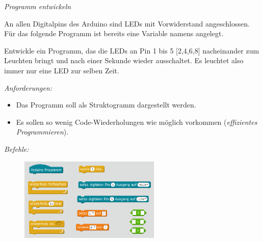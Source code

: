 \begin{aufgabe} \emph{Programm entwickeln}
	
	An allen Digitalpins des Arduino sind LEDs mit Vorwiderstand angeschlossen.	Für das folgende Programm ist bereits eine Variable namens  angelegt. 
	
	Entwickle ein Programm, das die LEDs an Pin 1 bis 5 [2,4,6,8] nacheinander zum Leuchten bringt und nach einer Sekunde wieder ausschaltet. Es leuchtet also immer nur eine LED zur selben Zeit. 
	
	\medskip
	\emph{Anforderungen:}
	\begin{itemize}[noitemsep]
		\item Das Programm soll als Struktogramm dargestellt werden.
		\item Es sollen so wenig Code-Wiederholungen wie möglich vorkommen (\emph{effizientes Programmieren}).
	\end{itemize}
		
	\emph{Befehle:}
	\begin{figure}[H]
		\centering
		\includegraphics[width=0.6\textwidth]{./pics/Uebung-Programm-entwickeln-Befehlssammlung.png}
	\end{figure}
\end{aufgabe}

